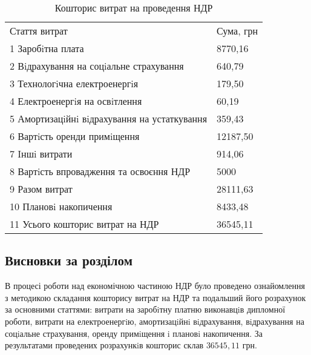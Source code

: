 \begin{table}[hbt]
	\captionstyle{ \raggedright}
	\caption{Кошторис витрат на проведення НДР}\label{tab:sumNDR}
	\begin{tabular}{|p{}|p{}|}
		\hline
		Стаття витрат & Сума, грн \\
		\hlinewd{2pt}
		1 Заробiтна плата & 8770,16 \\
		\hline
		2 Вiдрахування на соцiальне страхування & 640,79 \\
		\hline
		3 Технологiчна електроенергiя & 179,50 \\
		\hline
		4 Електроенергiя на освiтлення & 60,19 \\
		\hline
		5 Амортизацiйнi вiдрахування на устаткування & 359,43 \\
		\hline
		6 Вартiсть оренди примiщення & 12187,50 \\
		\hline
		7 Iншi витрати & 914,06 \\
		\hline
		8 Вартiсть впровадження та освоєння НДР & 5000 \\
		\hline
		9 Разом витрат & 28111,63 \\
		\hline
		10 Плановi накопичення & 8433,48 \\
		\hline
		11 Усього кошторис витрат на НДР & 36545,11 \\
		\hline
	\end{tabular}
\end{table}

\subsection{Висновки за розділом}

В процесі роботи над економічною частиною НДР було проведено ознайомлення з методикою складання кошторису витрат на НДР та подальший його розрахунок за основними статтями: витрати на заробiтну платню виконавцiв дипломної роботи, витрати на електроенергiю, амортизацiйнi вiдрахування, вiдрахування на соцiальне страхування, оренду примiщення i плановi накопичення. За результатами проведених розрахункiв кошторис склав $36545,11$ грн.

